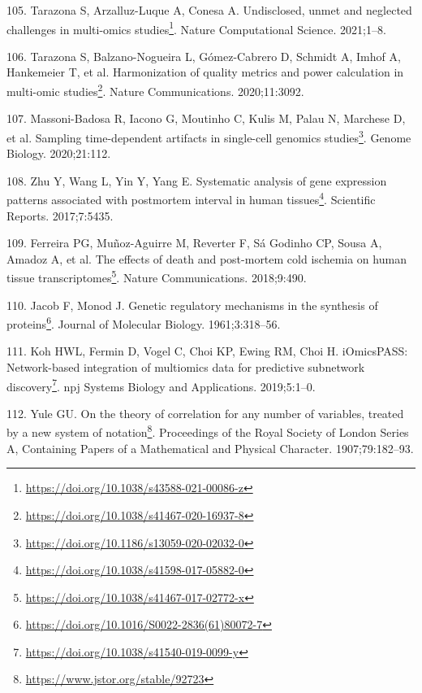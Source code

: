 \documentclass[
  a4paper,
]{book}
\DeclareRobustCommand{\href}[2]{#2\footnote{\url{#1}}}
\newlength{\cslhangindent}
\newlength{\cslentryspacingunit} %
\newenvironment{CSLReferences}[2] %
 {%
  \setlength{\parindent}{0pt}
  \ifodd #1
  \let\oldpar\par
  \def\par{\hangindent=\cslhangindent\oldpar}
  \fi
  \setlength{\parskip}{#2\cslentryspacingunit}
 }%
 {}
\begin{document}
\begin{CSLReferences}{0}{0}
\leavevmode{}%
105. Tarazona S, Arzalluz-Luque A, Conesa A. \href{https://doi.org/10.1038/s43588-021-00086-z}{Undisclosed, unmet and neglected challenges in multi-omics studies}. Nature Computational Science. 2021;1--8.

\leavevmode{}%
106. Tarazona S, Balzano-Nogueira L, Gómez-Cabrero D, Schmidt A, Imhof A, Hankemeier T, et al. \href{https://doi.org/10.1038/s41467-020-16937-8}{Harmonization of quality metrics and power calculation in multi-omic studies}. Nature Communications. 2020;11:3092.

\leavevmode{}%
107. Massoni-Badosa R, Iacono G, Moutinho C, Kulis M, Palau N, Marchese D, et al. \href{https://doi.org/10.1186/s13059-020-02032-0}{Sampling time-dependent artifacts in single-cell genomics studies}. Genome Biology. 2020;21:112.

\leavevmode{}%
108. Zhu Y, Wang L, Yin Y, Yang E. \href{https://doi.org/10.1038/s41598-017-05882-0}{Systematic analysis of gene expression patterns associated with postmortem interval in human tissues}. Scientific Reports. 2017;7:5435.

\leavevmode{}%
109. Ferreira PG, Muñoz-Aguirre M, Reverter F, Sá Godinho CP, Sousa A, Amadoz A, et al. \href{https://doi.org/10.1038/s41467-017-02772-x}{The effects of death and post-mortem cold ischemia on human tissue transcriptomes}. Nature Communications. 2018;9:490.

\leavevmode{}%
110. Jacob F, Monod J. \href{https://doi.org/10.1016/S0022-2836(61)80072-7}{Genetic regulatory mechanisms in the synthesis of proteins}. Journal of Molecular Biology. 1961;3:318--56.

\leavevmode{}%
111. Koh HWL, Fermin D, Vogel C, Choi KP, Ewing RM, Choi H. \href{https://doi.org/10.1038/s41540-019-0099-y}{{iOmicsPASS}: Network-based integration of multiomics data for predictive subnetwork discovery}. npj Systems Biology and Applications. 2019;5:1--0.

\leavevmode{}%
112. Yule GU. \href{https://www.jstor.org/stable/92723}{On the theory of correlation for any number of variables, treated by a new system of notation}. Proceedings of the Royal Society of London Series A, Containing Papers of a Mathematical and Physical Character. 1907;79:182--93.


\end{CSLReferences}
\end{document}
